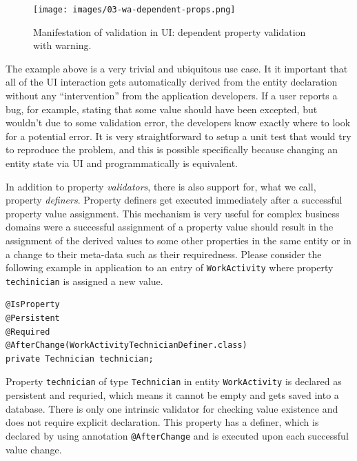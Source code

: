 \documentclass[a4paper,12pt,oneside,openright,final]{memoir} %
\begin{document}
	\begin{figure}[!h]
  		\centering
      	\texttt{[image: images/03-wa-dependent-props.png]}  
   	  	\caption{Manifestation of validation in UI: dependent property validation with warning.}
   		\label{fig:dependent-validation}
  	\end{figure}

	The example above is a very trivial and ubiquitous use case.
	It it important that all of the UI interaction gets automatically derived from the entity declaration without any ``intervention'' from the application developers.
	If a user reports a bug, for example, stating that some value should have been excepted, but wouldn't due to some validation error, the developers know exactly where to look for a potential error.
	It is very straightforward to setup a unit test that would try to reproduce the problem, and this is possible specifically because changing an entity state via UI and programmatically is equivalent.
	
	\vspace{8pt}
	In addition to property \emph{validators}, there is also support for, what we call, property \emph{definers}.
	Property definers get executed immediately after a successful property value assignment.
	This mechanism is very useful for complex business domains were a successful assignment of a property value should result in the assignment of the derived values to some other properties in the same entity or in a change to their meta-data such as their requiredness.
	Please consider the following example in application to an entry of \texttt{WorkActivity} where property \texttt{techinician} is assigned a new value.
	
	\begin{tcolorbox}[sidebyside, righthand width=0.38\textwidth, title=Example: property with a definer]
    \begin{lstlisting}[numbersep=2pt]
@IsProperty
@Persistent
@Required
@AfterChange(WorkActivityTechnicianDefiner.class)
private Technician technician;
    \end{lstlisting}
	
	\tcblower
		\tiny
		Property \texttt{technician} of type \texttt{Technician} in entity \texttt{WorkActivity} is declared as persistent and requried, which means it cannot be empty and gets saved into a database.
		There is only one intrinsic validator for checking value existence and does not require explicit declaration.
		This property has a definer, which is declared by using annotation \texttt{@AfterChange} and is executed upon each successful value change.
 	\end{tcolorbox}
\end{document}
